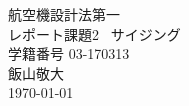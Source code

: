 \documentclass[./main]{subfiles}
\begin{document}
  \begin{titlepage}
  \begin{center}
  \vspace*{150truept}
  {\huge 航空機設計法第一}\\ %
  \vspace{15truept}
  {\huge レポート課題2 \ サイジング}\\ %
  \vspace{200truept}
  {\large 学籍番号 03-170313}\\ %
  \vspace{10truept}
  {\large 飯山敬大}\\ %
  \vspace{10truept}
  {\large \today}\\ %
  \end{center}
  \end{titlepage}
\end{document}
